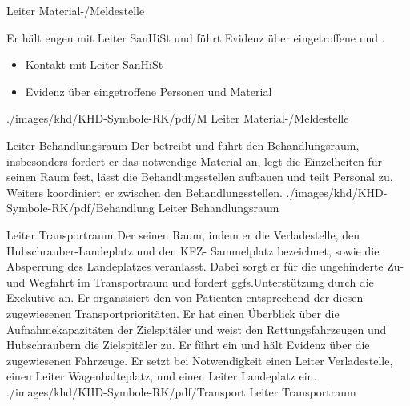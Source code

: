 \TextSlideTeaser
{Leiter Material-/Meldestelle}%
{%
%
%
Er hält engen  mit Leiter SanHiSt und 
führt Evidenz über eingetroffene  und . 
\cite{RkRahmenvorschriftGrossunfaelle2007}

\vspace{4\baselineskip}

}%
{
\begin{itemize}
  \item Kontakt mit Leiter SanHiSt
  \item Evidenz über eingetroffene Personen und Material
\end{itemize}
}%
{./images/khd/KHD-Symbole-RK/pdf/M}%
{Leiter Material-/Meldestelle}%
{}%
{}%
{}%



\TextSlideTeaser
{Leiter Behandlungsraum}%
{%
%
%
Der  betreibt und führt den Behandlungsraum,
insbesonders 
fordert er das notwendige Material an,
legt die Einzelheiten für seinen Raum fest,
lässt die Behandlungsstellen aufbauen und
teilt Personal zu.
Weiters koordiniert er zwischen den Behandlungsstellen.
\cite{RkRahmenvorschriftGrossunfaelle2007}
}%
{\SymbolText}%
{./images/khd/KHD-Symbole-RK/pdf/Behandlung}%
{Leiter Behandlungsraum}%
{}%
{}%
{}%




\TextSlideTeaser
{Leiter Transportraum}%
{%
%
%
Der   seinen Raum, 
indem er die Verladestelle, 
den Hubschrauber-Landeplatz 
und den KFZ- Sammelplatz bezeichnet, 
sowie die Absperrung des Landeplatzes veranlasst.
%
Dabei sorgt er für die ungehinderte Zu- und Wegfahrt im Transportraum
und fordert ggfs.Unterstützung durch die Exekutive an.
%
Er organsisiert den  von Patienten entsprechend der diesen 
zugewiesenen
Transportprioritäten.
Er hat einen Überblick über die Aufnahmekapazitäten der Zielspitäler 
und weist den Rettungsfahrzeugen 
und Hubschraubern die Zielspitäler zu.
%
Er führt ein  
und hält Evidenz über die zugewiesenen Fahrzeuge.
%
Er setzt bei Notwendigkeit einen Leiter Verladestelle, einen Leiter 
Wagenhalteplatz, und
einen Leiter Landeplatz ein.
\cite{RkRahmenvorschriftGrossunfaelle2007}
}%
{\SymbolText}%
{./images/khd/KHD-Symbole-RK/pdf/Transport}%
{Leiter Transportraum}%
{}%
{}%
{}%

